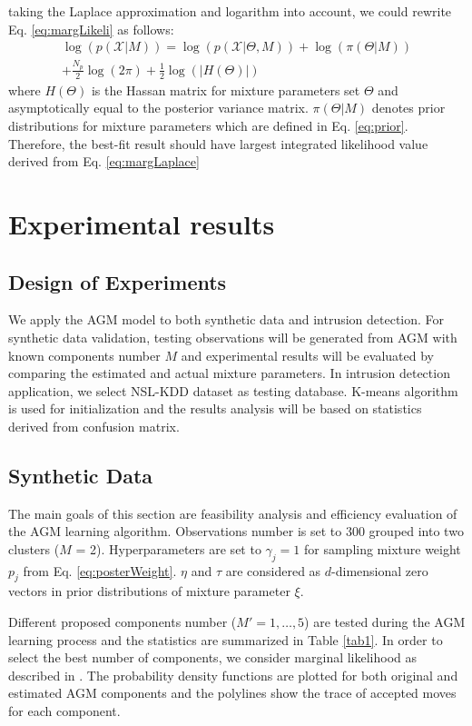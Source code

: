 \documentclass[conference]{IEEEtran}
\begin{document}
taking the Laplace approximation\cite{b4} and logarithm into account, we could rewrite Eq. \eqref{eq:margLikeli} as follows:
\begin{multline}
\log(p(\mathcal{X}|M)) = \log(p(\mathcal{X}|\Theta,M)) + \log(\pi(\Theta|M)) \\
+ \frac{N_p}{2}\log(2\pi) + \frac{1}{2}\log(|H(\Theta)|)\qquad
\label{eq:margLaplace}
\end{multline}
where $H(\Theta)$ is the Hassan matrix for mixture parameters set $\Theta$ and asymptotically equal to the posterior variance matrix. $\pi(\Theta|M)$ denotes prior distributions for mixture parameters which are defined in Eq. \eqref{eq:prior}. Therefore, the best-fit result should have largest integrated likelihood value derived from Eq. \eqref{eq:margLaplace}

\section{Experimental results}
\subsection{Design of Experiments}
We apply the AGM model to both synthetic data and intrusion detection. For synthetic data validation, testing observations will be generated from AGM with known components number $M$ and experimental results will be evaluated by comparing the estimated and actual mixture parameters. In intrusion detection application, we select NSL-KDD dataset \cite{b12} as testing database. K-means algorithm is used for initialization and the results analysis will be based on statistics derived from confusion matrix.

\subsection{Synthetic Data}
The main goals of this section are feasibility analysis and efficiency evaluation of the AGM learning algorithm. Observations number is set to 300 grouped into two clusters ($M$ = 2). Hyperparameters are set to $\gamma_j = 1$ \cite{b13} for sampling mixture weight $p_j$ from Eq. \eqref{eq:posterWeight}. $\eta$ and $\tau$ are considered as $d$-dimensional zero vectors in prior distributions of mixture parameter $\xi$.

Different proposed components number ($M' = 1,\dots,5$) are tested during the AGM learning process and the statistics are summarized in Table \ref{tab1}. In order to select the best number of components, we consider marginal likelihood as described in \cite{b4}. The probability density functions are plotted for both original and estimated AGM components and the polylines show the trace of accepted moves for each component.
\end{document}
